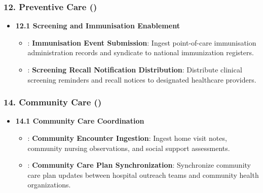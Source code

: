 \subsubsection*{12. Preventive Care (\texttt{})}
\label{rad:enabling:420}

\begin{itemize}

\item
\textbf{12.1 Screening and Immunisation Enablement}


\begin{itemize}

\item
\texttt{}: \textbf{Immunisation Event Submission}: Ingest point-of-care immunisation administration records and syndicate to national immunization registers.



\item
\texttt{}: \textbf{Screening Recall Notification Distribution}: Distribute clinical screening reminders and recall notices to designated healthcare providers.



\end{itemize}


\end{itemize}
\label{rad:enabling:424}
\subsubsection*{14. Community Care (\texttt{})}
\label{rad:enabling:425}

\begin{itemize}

\item
\textbf{14.1 Community Care Coordination}


\begin{itemize}

\item
\texttt{}: \textbf{Community Encounter Ingestion}: Ingest home visit notes, community nursing observations, and social support assessments.



\item
\texttt{}: \textbf{Community Care Plan Synchronization}: Synchronize community care plan updates between hospital outreach teams and community health organizations.



\end{itemize}


\end{itemize}
\label{rad:enabling:429}
